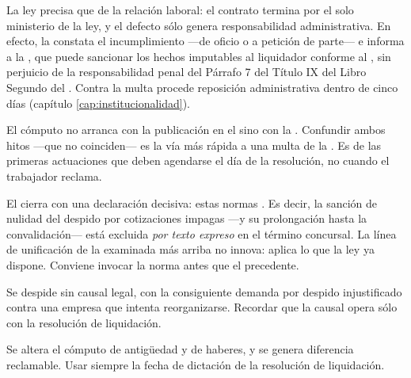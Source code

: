 La ley precisa que  de la
relación laboral: el contrato termina por el solo ministerio de la ley, y el defecto sólo genera
responsabilidad administrativa. En efecto, la \dt{} constata el incumplimiento ---de oficio o a
petición de parte--- e informa a la \superir{}, que puede sancionar los hechos imputables al
liquidador conforme al , sin perjuicio de la responsabilidad penal del Párrafo 7 del
Título IX del Libro Segundo del \cpen{}. Contra la multa procede reposición administrativa dentro
de cinco días (capítulo \ref{cap:institucionalidad}).

\begin{alerta}
El cómputo no arranca con la publicación en el \boletin{} sino con la . Confundir ambos hitos ---que no coinciden--- es la vía
más rápida a una multa de la \superir{}. Es de las primeras actuaciones que deben agendarse el día
de la resolución, no cuando el trabajador reclama.
\end{alerta}

\begin{foco}
El   cierra con una declaración decisiva: estas normas
. Es decir, la sanción de
nulidad del despido por cotizaciones impagas ---y su prolongación hasta la convalidación--- está
excluida \emph{por texto expreso} en el término concursal. La línea de unificación de la \csup{}
examinada más arriba no innova: aplica lo que la ley ya dispone. Conviene invocar la norma antes
que el precedente.
\end{foco}

\bloqueErrores

{Se despide sin causal legal, con la consiguiente demanda por despido injustificado
contra una empresa que intenta reorganizarse.}
{Recordar que la causal opera sólo con la resolución de liquidación.}

{Se altera el cómputo de antigüedad y de haberes, y se genera diferencia reclamable.}
{Usar siempre la fecha de dictación de la resolución de liquidación.}

